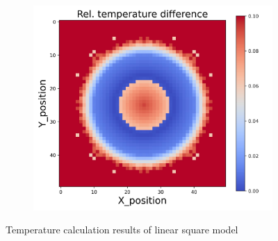\begin{figure}[h]
\begin{minipage}{\textwidth}
\begin{subfigure}{0.3\textwidth}
        \end{subfigure}
        \begin{subfigure}{0.3\textwidth}
            \centering
            \includegraphics[width=\textwidth]{figures/raw_data/33/lin_square/T_bias.jpg}
        \end{subfigure}
    \end{minipage}
    \caption{Temperature calculation results of linear square model}  
\end{figure}
